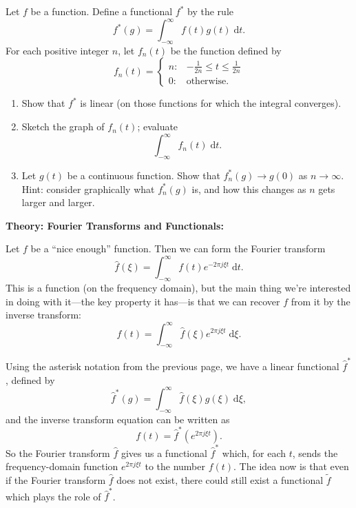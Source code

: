 \documentclass{article}
\newcommand{\diff}{\;\mathrm{d}}
\begin{document}
 Let $f$ be a function. Define a functional $f^*$ by the rule
\[f^*(g)=\int_{-\infty}^\infty f(t)g(t)\diff t.\]
For each positive integer $n$, let $f_n(t)$ be the function defined by
\[f_n(t)=\begin{cases} n : & -\frac{1}{2n}\leq t\leq \frac{1}{2n}\\ 0 : & \mbox{otherwise.}\end{cases}\]
		
		
\begin{enumerate}
	\item Show that $f^*$ is linear (on those functions for which the integral converges).
	\item Sketch the graph of $f_n(t)$; evaluate
		\[\int_{-\infty}^\infty f_n(t)\diff t.\]
	\item Let $g(t)$ be a continuous function. Show that $f_n^*(g)\to g(0)$ as $n\to \infty$. Hint: consider graphically what $f^*_n(g)$ is, and how this changes as $n$ gets larger and larger.
\end{enumerate}




\clearpage











\textbf{Theory: Fourier Transforms and Functionals:}\bigskip


Let $f$ be a ``nice enough'' function. Then we can form the Fourier transform
\[\hat{f}(\xi)=\int_{-\infty}^\infty f(t)e^{-2\pi j\xi t}\diff t.\]
This is a function (on the frequency domain), but the main thing we're interested in doing with it---the key property it has---is that we can recover $f$ from it by the inverse transform:
\[f(t)=\int_{-\infty}^\infty \hat{f}(\xi)e^{2\pi j\xi t}\diff \xi.\]

Using the asterisk notation from the previous page, we have a linear functional $\hat{f}^*$, defined by
\[\hat{f}^*(g)=\int_{-\infty}^\infty \hat{f}(\xi)g(\xi)\diff \xi,\]
and the inverse transform equation can be written as
\[f(t)=\hat{f}^*\left(e^{2\pi j\xi t}\right).\]
So the Fourier transform $\hat{f}$ gives us a functional $\hat{f}^*$ which, for each $t$, sends the frequency-domain function $e^{2\pi j\xi t}$ to the number $f(t)$. The idea now is that even if the Fourier transform $\hat{f}$ does not exist, there could still exist a functional $\tilde{f}$ which plays the role of $\hat{f}^*$.\medskip
\end{document}
